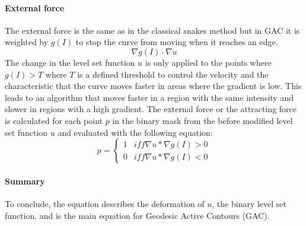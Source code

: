 \paragraph{External force}
The external force is the same as in the classical snakes method but in GAC it is weighted by $g(I)$ to stop the curve from moving when it reaches an edge.
\begin{equation}
    \nabla g(I) \cdot \nabla u
\end{equation}
The change in the level set function $u$ is only applied to the points where $g(I) > T$ where $T$ is a defined threshold to control the velocity and the characteristic that the curve moves faster in areas where the gradient is low. This leads to an algorithm that moves faster in a region with the same intensity and slower in regions with a high gradient. 
The external force or the attracting force is calculated for each point $p$ in the binary mask from the before modified level set function $u$ and evaluated with the following equation:
\begin{equation}
    p = \begin{cases}
        1 &iff  \nabla u * \nabla g(I) > 0 \\
        0 &iff \nabla u * \nabla g(I) < 0
    \end{cases}
    \label{eq:externalforce}
\end{equation}
\paragraph{Summary}
To conclude, the equation  describes the deformation of $u$, the binary level set function. and is the main equation for Geodesic Active Contours (GAC). 

